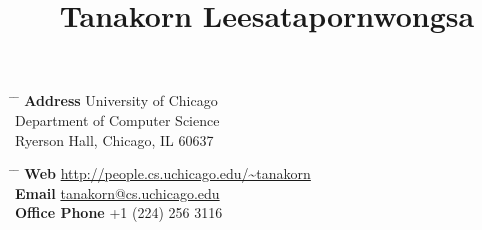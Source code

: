 \documentclass[10pt]{article} %
\begin{document}

\title{Tanakorn Leesatapornwongsa} %


\parbox{0.4\textwidth}{ %
\begin{tabbing} %
\hspace{1.5cm} \= \hspace{2cm} \= \kill %
{\bf Address} \> University of Chicago\\ %
\> Department of Computer Science \\ %
\> Ryerson Hall, Chicago, IL 60637 \\ %
\end{tabbing}}
\hfill %
\parbox{0.6\textwidth}{ %
\begin{tabbing} %
\hspace{2.3cm} \= \hspace{2cm} \= \kill %
{\bf Web} \> \href{http://people.cs.uchicago.edu/\~tanakorn}{http://people.cs.uchicago.edu/\textasciitilde tanakorn} \\ %
{\bf Email} \> \href{mailto:tanakorn@cs.uchicago.edu}{tanakorn@cs.uchicago.edu} \\ %
{\bf Office Phone} \> +1 (224) 256 3116 \\ %
\end{tabbing}}



\end{document}
